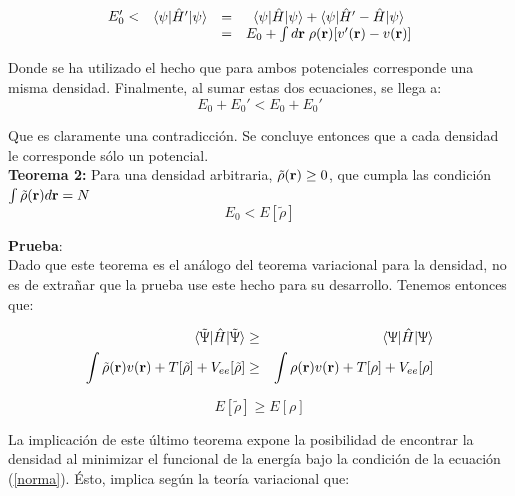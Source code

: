 \documentclass [11pt]{article}
\begin{document}
\begin{equation}
	\begin{array}{c}
	     E_0' <\\
	     \\
	\end{array} 
	\begin{array}{ccc}
	     \langle\psi|\hat{H}'|\psi\rangle & = & \langle\psi|\hat{H}|\psi\rangle+\langle\psi|\hat{H}'-\hat{H}|\psi\rangle\\
	                                      & = & E_0+\int d{\bf r}\hspace{0.1 cm}\rho({\bf r})[v'({\bf r} )-v({\bf r})]
	\end{array}
\end{equation}

Donde se ha utilizado el hecho que para ambos potenciales corresponde una misma densidad. Finalmente, al sumar estas dos ecuaciones, se llega a:
\begin{equation}
	E_0+E_0' <E_0+E_0'
\end{equation}

Que es claramente una contradicción. Se concluye entonces que a cada densidad le corresponde sólo un potencial.\\

{\bf Teorema 2:} Para una densidad arbitraria, $\tilde \rho({\bf r}) \geq 0$, que cumpla las condición $\int \tilde\rho({\bf r})d{\bf r}=N$\\
\begin{equation}
    E_0<E[\tilde\rho]
\end{equation}	

{\bf Prueba}:\\
Dado que este teorema es el análogo del teorema variacional para la densidad, no es de extrañar que la prueba use este hecho para su desarrollo. Tenemos entonces que:

\begin{eqnarray*}
    \langle\tilde\Uppsi|\hat H|\tilde\Uppsi\rangle & \geq & \langle\Uppsi|\hat H|\Uppsi\rangle\\
    \int \tilde\rho({\bf r})v({\bf r})+T[\tilde\rho]+V_{ee}[\tilde\rho] & \geq & \int \rho({\bf r})v({\bf r})+T[\rho]+V_{ee}[\rho]
\end{eqnarray*}

\begin{equation}
    E[\tilde\rho]  \geq  E[\rho]
\end{equation}

La implicación de este último teorema expone la posibilidad de encontrar la densidad al minimizar el funcional de la energía bajo la condición de la ecuación (\ref{norma}). Ésto, implica según la teoría variacional que:
\end{document}
